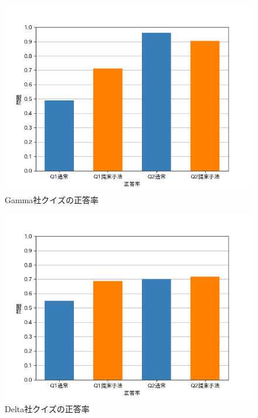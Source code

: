\begin{figure}[h]
  \begin{center}
      \includegraphics[width=13cm]{img/qgraphGamma.png}
      \caption{Gamma社クイズの正答率}
      \label{img:Gamma社クイズの正答率}
  \end{center}
\end{figure}
\begin{figure}[h]
  \begin{center}
      \includegraphics[width=13cm]{img/qgraphDelta.png}
      \caption{Delta社クイズの正答率}
      \label{img:Delta社クイズの正答率}
  \end{center}
\end{figure}
